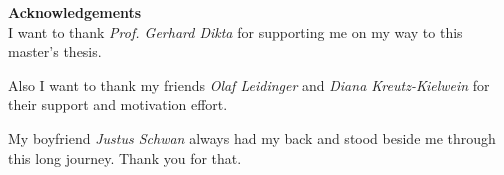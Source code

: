 

\tableofcontents











\begin{appendix}

\listoffigures

\listoftables




\end{appendix}

\clearpage
\thispagestyle{empty}


\noindent\textsf{\Huge{\textbf{\textcolor{chapter}{Acknowledgements}}}}
\vspace*{2ex}\\

\noindent I want to thank \emph{Prof. Gerhard Dikta} for supporting me on my way to this master's thesis.

Also I want to thank my friends \emph{Olaf Leidinger} and \emph{Diana Kreutz-Kielwein} for their support and motivation effort.

My boyfriend \emph{Justus Schwan} always had my back and stood beside me through this long journey. Thank you for that.



